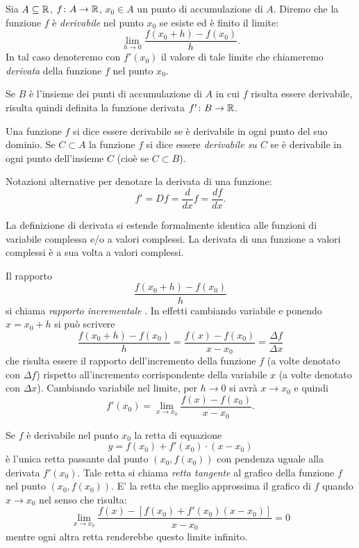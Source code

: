 \begin{definition}[derivata]
\mymark{***}%
Sia $A\subseteq {\mathbb R}$, $f\colon A \to {\mathbb R}$, 
$x_0\in A$ un punto di accumulazione di $A$.
Diremo che la funzione $f$ è \emph{derivabile} nel punto $x_0$ se esiste
ed è finito il limite:
\[
  \lim_{h\to 0} \frac{f(x_0+h) - f(x_0)}{h}.
\]
In tal caso denoteremo con $f'(x_0)$ il valore di tale limite che chiameremo
\emph{derivata}%
%
 della funzione $f$ nel punto $x_0$.

Se $B$ è l'insieme dei punti di accumulazione di $A$ in cui $f$ risulta essere derivabile, risulta quindi definita la funzione derivata $f'\colon B \to {\mathbb R}$.

Una funzione $f$ si dice essere derivabile se è derivabile in ogni punto del suo dominio.
Se $C\subset A$ la funzione $f$ si dice essere \emph{derivabile su $C$} se è derivabile in ogni punto dell'insieme $C$ (cioè se $C\subset B$).

Notazioni alternative per denotare la derivata di una funzione:
\[
  f' = Df = \frac{d}{dx} f = \frac{df}{dx}.
\]

La definizione di derivata si estende formalmente identica 
alle funzioni di variabile complessa e/o a valori complessi.
La derivata di una funzione a valori complessi è
a sua volta a valori complessi.
\end{definition}

Il rapporto
\[
\frac{f(x_0+h) - f(x_0)}{h}
\]
si chiama \emph{rapporto incrementale}%
%
. In effetti cambiando variabile e ponendo $x=x_0+h$ si può scrivere
\[
\frac{f(x_0+h) - f(x_0)}{h}
= \frac{f(x) - f(x_0)}{x-x_0}
= \frac{\Delta f}{\Delta x}
\]
che risulta essere il rapporto dell'incremento della funzione $f$ (a volte denotato con $\Delta f$) rispetto all'incremento corrispondente della variabile $x$ (a volte denotato con $\Delta x$).
Cambiando variabile nel limite, per $h\to 0$ si avrà $x\to x_0$
e quindi
\[
 f'(x_0) = \lim_{x\to x_0} \frac{f(x)-f(x_0)}{x-x_0}.
\]

Se $f$ è derivabile nel punto $x_0$
la retta di equazione 
%
\begin{equation}\label{eq:retta_tangente}
  y = f(x_0) + f'(x_0) \cdot (x-x_0)  
\end{equation}
è l'unica retta passante dal punto $(x_0,f(x_0))$ 
con pendenza uguale alla derivata $f'(x_0)$.
Tale retta si chiama \emph{retta tangente}
%
%
al grafico della funzione $f$ nel punto $(x_0,f(x_0))$.
E' la retta che meglio approssima il grafico di $f$ 
quando $x\to x_0$ nel senso che risulta:
\[
  \lim_{x\to x_0} \frac{f(x) - [f(x_0)+f'(x_0)(x-x_0)]}{x-x_0} = 0
\]
mentre ogni altra retta renderebbe questo limite infinito.

